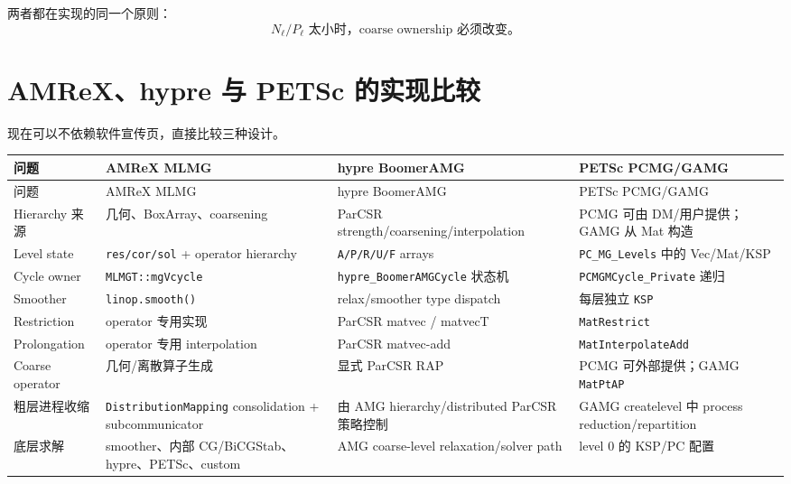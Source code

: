 两者都在实现的同一个原则：
\begin{equation}
\boxed{
N_\ell/P_\ell
\text{ 太小时，coarse ownership 必须改变。}
}
\end{equation}

\section{AMReX、hypre 与 PETSc 的实现比较}

现在可以不依赖软件宣传页，直接比较三种设计。

{\small
\begin{longtable}{@{}>{\raggedright\arraybackslash}p{2.3cm}
                        >{\raggedright\arraybackslash}p{3.5cm}
                        >{\raggedright\arraybackslash}p{3.5cm}
                        >{\raggedright\arraybackslash}p{3.5cm}@{}}
\toprule
问题 & AMReX MLMG & hypre BoomerAMG & PETSc PCMG/GAMG\\
\midrule
\endfirsthead
\toprule
问题 & AMReX MLMG & hypre BoomerAMG & PETSc PCMG/GAMG\\
\midrule
\endhead
Hierarchy 来源 &
几何、BoxArray、coarsening &
ParCSR strength/coarsening/interpolation &
PCMG 可由 DM/用户提供；GAMG 从 Mat 构造\\

Level state &
\texttt{res/cor/sol} + operator hierarchy &
\texttt{A/P/R/U/F} arrays &
\texttt{PC\_MG\_Levels} 中的 Vec/Mat/KSP\\

Cycle owner &
\texttt{MLMGT::mgVcycle} &
\texttt{hypre\_BoomerAMGCycle} 状态机 &
\texttt{PCMGMCycle\_Private} 递归\\

Smoother &
\texttt{linop.smooth()} &
relax/smoother type dispatch &
每层独立 \texttt{KSP}\\

Restriction &
operator 专用实现 &
ParCSR matvec / matvecT &
\texttt{MatRestrict}\\

Prolongation &
operator 专用 interpolation &
ParCSR matvec-add &
\texttt{MatInterpolateAdd}\\

Coarse operator &
几何/离散算子生成 &
显式 ParCSR RAP &
PCMG 可外部提供；GAMG \texttt{MatPtAP}\\

粗层进程收缩 &
\texttt{DistributionMapping} consolidation + subcommunicator &
由 AMG hierarchy/distributed ParCSR 策略控制 &
GAMG createlevel 中 process reduction/repartition\\

底层求解 &
smoother、内部 CG/BiCGStab、hypre、PETSc、custom &
AMG coarse-level relaxation/solver path &
level 0 的 KSP/PC 配置\\
\bottomrule
\end{longtable}
}

